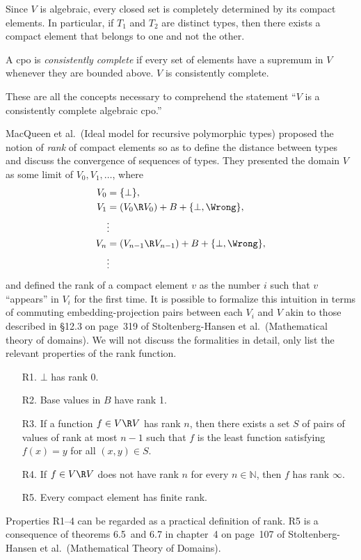 \documentclass{amsart}
\begin{document}
Since $V$ is algebraic, every closed set is completely determined
by its compact elements. In particular, if $T_1$ and $T_2$ are
distinct types, then there exists a compact element that belongs
to one and not the other.

A cpo is \emph{consistently complete} if every set of elements
have a supremum in $V$ whenever they are bounded above. $V$ is
consistently complete.

These are all the concepts necessary to comprehend the statement
``$V$ is a consistently complete algebraic cpo.''



MacQueen et al.\ (Ideal model for recursive polymorphic types)
proposed the notion of \emph{rank} of compact elements so as to
define the distance between types and discuss the convergence of
sequences of types. They presented the domain $V$ as some limit
of $V_0,V_1,\ldots$, where
\begin{align*}
V_0 &= \{\bot\},\\
V_1 &= (V_0\R V_0)+B+\{\bot,\Wrong\},\\
&\vdots\\
V_n &= (V_{n-1} \R V_{n-1}) + B + \{\bot,\Wrong\},\\
&\vdots
\end{align*}
and defined the rank of a compact element $v$ as the number $i$
such that $v$ ``appears'' in $V_i$ for the first time. It is
possible to formalize this intuition in terms of commuting
embedding-projection pairs between each $V_i$ and $V$ akin to
those described in \S12.3 on page~319 of Stoltenberg-Hansen et
al.\ (Mathematical theory of domains). We will not discuss the
formalities in detail, only list the relevant properties of the
rank function.
\begin{itemize}\itemsep=1ex
\item[R1.] $\bot$ has rank 0.

\item[R2.] Base values in $B$ have rank 1.

\item[R3.] If a function $f\in V\R V$ has rank $n$, then there
exists a set $S$ of pairs of values of rank at most $n-1$ such
that $f$ is the least function satisfying $f(x)=y$ for all
$(x,y)\in S$.

\item[R4.] If $f\in V \R V$ does not have rank $n$ for every
$n\in\mathbb N$, then $f$ has rank $\infty$.

\item[R5.] Every compact element has finite rank.
\end{itemize}
Properties R1--4 can be regarded as a practical definition of
rank. R5 is a consequence of theorems 6.5~and 6.7 in chapter~4 on
page~107 of Stoltenberg-Hansen et al.\ (Mathematical Theory of
Domains).
\end{document}
